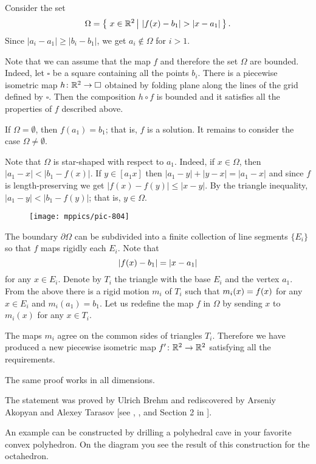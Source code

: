 Consider the set 
\[\Omega=\set{x\in\RR^2}{|f(x)-b_1|>|x-a_1|}.\]
Since $|a_i-a_1|\ge|b_i-b_1|$, we get $a_i\notin \Omega$ for $i>1$.

Note that we can assume that the map $f$ and therefore the set $\Omega$ are bounded.
Indeed, let $\square$ be a square containing all the points $b_i$.
There is a piecewise isometric map $h\colon\mathbb{R}^2\to\square$ obtained by folding plane along the lines of the grid defined by $\square$.
Then the composition $h\circ f$ is bounded and it satisfies all the properties of $f$ described above.

If $\Omega=\emptyset$,
then $f(a_1)=b_1$; 
that is, $f$ is a solution.
It remains to consider the case $\Omega\ne\emptyset$. 

Note that $\Omega$ is star-shaped with respect to $a_1$.
Indeed, if $x\in \Omega$, then $|a_1-x|<|b_1-f(x)|$.
If $y\in [a_1x]$ then 
$|a_1-y|+|y-x|=|a_1-x|$ and since $f$ is length-preserving we get $|f(x)-f(y)|\le |x-y|$.
By the triangle inequality, 
$|a_1-y|<|b_1-f(y)|$; that is, $y\in\Omega$. 

\begin{wrapfigure}{o}{47 mm}
\vskip-0mm
\centering
\texttt{[image: mppics/pic-804]}
\end{wrapfigure}

The boundary $\partial\Omega$ can be subdivided into a finite collection of line segments $\{E_i\}$
so that $f$ maps rigidly each $E_i$.
Note that 
\[|f(x)\z-b_1|=|x-a_1|\]
for any $x\in E_i$.
Denote by $T_i$ the triangle with the base $E_i$ and the vertex $a_1$.
From the above there is a rigid motion $m_i$ of $T_i$ such that $m_i(x)\z=f(x)$ for any $x\in E_i$ and $m_i(a_1)=b_1$.
Let us redefine the map $f$ in $\Omega$ by sending $x$ to $m_i(x)$ for any $x\in T_i$.

The maps $m_i$ agree on the common sides of triangles $T_i$.
Therefore we have produced a new piecewise isometric map $f'\colon\mathbb{R}^2\to \mathbb{R}^2$ satisfying all the requirements.
\qeds

The same proof works in all dimensions.

The statement was proved by Ulrich Brehm 
and rediscovered by Arseniy Akopyan and Alexey Tarasov [see , , and Section 2 in ].


An example can be constructed by drilling a polyhedral cave in your favorite convex polyhedron.
On the diagram you see the result of this construction for the octahedron.

